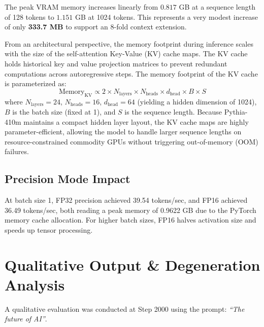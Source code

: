 \documentclass[11pt,a4paper]{article}
\begin{document}
The peak VRAM memory increases linearly from $0.817$ GB at a sequence length of 128 tokens to $1.151$ GB at 1024 tokens. This represents a very modest increase of only \textbf{333.7 MB} to support an 8-fold context extension. 

From an architectural perspective, the memory footprint during inference scales with the size of the self-attention Key-Value (KV) cache maps. The KV cache holds historical key and value projection matrices to prevent redundant computations across autoregressive steps. The memory footprint of the KV cache is parameterized as:
\begin{equation}
\text{Memory}_{\text{KV}} \propto 2 \times N_{\text{layers}} \times N_{\text{heads}} \times d_{\text{head}} \times B \times S
\end{equation}
where $N_{\text{layers}} = 24$, $N_{\text{heads}} = 16$, $d_{\text{head}} = 64$ (yielding a hidden dimension of 1024), $B$ is the batch size (fixed at 1), and $S$ is the sequence length. Because Pythia-410m maintains a compact hidden layer layout, the KV cache maps are highly parameter-efficient, allowing the model to handle larger sequence lengths on resource-constrained commodity GPUs without triggering out-of-memory (OOM) failures.

\subsection{Precision Mode Impact}
At batch size 1, FP32 precision achieved 39.54 tokens/sec, and FP16 achieved 36.49 tokens/sec, both reading a peak memory of 0.9622 GB due to the PyTorch memory cache allocation. For higher batch sizes, FP16 halves activation size and speeds up tensor processing.

\section{Qualitative Output \& Degeneration Analysis}
A qualitative evaluation was conducted at Step 2000 using the prompt: \textit{``The future of AI''}.
\end{document}
